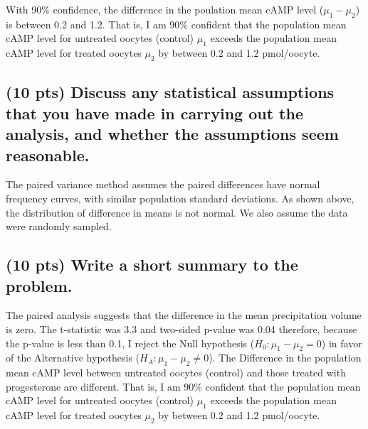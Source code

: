 \documentclass{article}\usepackage[]{graphicx}\usepackage[]{color}
\begin{document}
With 90\% confidence, the difference in the poulation mean cAMP level ($\mu_1 - \mu_2$) is between 0.2  and 1.2.  That is, I am $90\%$ confident that the population mean cAMP level for untreated oocytes (control) $\mu_1$ exceeds the population mean cAMP level for treated oocytes $\mu_2$ by between 0.2 and 1.2 pmol/oocyte.

\subsection{(10 pts) Discuss any statistical assumptions that you have made in carrying out the analysis, and whether the assumptions seem reasonable.}

The paired variance method assumes the paired differences have normal frequency curves, with similar population standard deviations.  As shown above, the distribution of difference in means is not normal.  We also assume the data were randomly sampled.

\subsection{(10 pts) Write a short summary to the problem.}

The paired analysis suggests that the difference in the mean precipitation volume is  zero.  The t-statistic was 3.3 and two-sided p-value was 0.04 therefore, because the p-value is less than 0.1, I reject the Null hypothesis ($H_0: \mu_1 - \mu_2 = 0$) in favor of the Alternative hypothesis ($H_A: \mu_1 - \mu_2 \ne 0$).  The Difference in the population mean cAMP level between untreated oocytes (control) and those treated with progesterone are different.  That is, I am $90\%$ confident that the population mean cAMP level for untreated oocytes (control) $\mu_1$ exceeds the population mean cAMP level for treated oocytes $\mu_2$ by between 0.2 and 1.2 pmol/oocyte.
\end{document}

